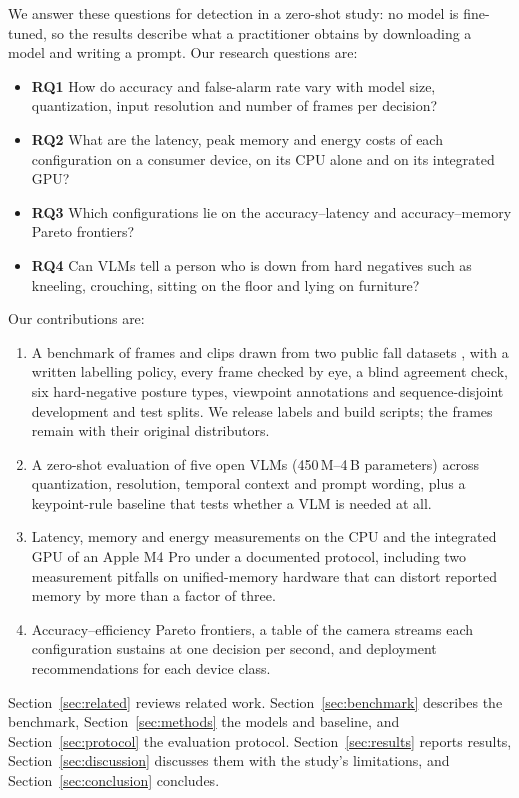 We answer these questions for \pd{} detection in a zero-shot study: no model is fine-tuned, so the results describe what a practitioner obtains by downloading a model and writing a prompt. Our research questions are:
\begin{itemize}
  \item \textbf{RQ1} How do accuracy and false-alarm rate vary with model size, quantization, input resolution and number of frames per decision?
  \item \textbf{RQ2} What are the latency, peak memory and energy costs of each configuration on a consumer device, on its CPU alone and on its integrated GPU?
  \item \textbf{RQ3} Which configurations lie on the accuracy--latency and accuracy--memory Pareto frontiers?
  \item \textbf{RQ4} Can VLMs tell a person who is down from hard negatives such as kneeling, crouching, sitting on the floor and lying on furniture?
\end{itemize}

Our contributions are:
\begin{enumerate}
  \item A \pd{} benchmark of \BenchNKept{} frames and clips drawn from two public fall datasets \cite{kwolek2014urfall,auvinet2010mcfd}, with a written labelling policy, every frame checked by eye\iffullcheck\else{}\fi{}, a blind agreement check, six hard-negative posture types, viewpoint annotations and sequence-disjoint development and test splits. We release labels and build scripts; the frames remain with their original distributors.
  \item A zero-shot evaluation of five open VLMs (450\,M--4\,B parameters) across quantization, resolution, temporal context and prompt wording, plus a keypoint-rule baseline that tests whether a VLM is needed at all.
  \item Latency, memory and energy measurements on the CPU and the integrated GPU of an Apple M4 Pro under a documented protocol, including two measurement pitfalls on unified-memory hardware that can distort reported memory by more than a factor of three.
  \item Accuracy--efficiency Pareto frontiers, a table of the camera streams each configuration sustains at one decision per second, and deployment recommendations for each device class.
\end{enumerate}

Section~\ref{sec:related} reviews related work. Section~\ref{sec:benchmark} describes the benchmark, Section~\ref{sec:methods} the models and baseline, and Section~\ref{sec:protocol} the evaluation protocol. Section~\ref{sec:results} reports results, Section~\ref{sec:discussion} discusses them with the study's limitations, and Section~\ref{sec:conclusion} concludes.
